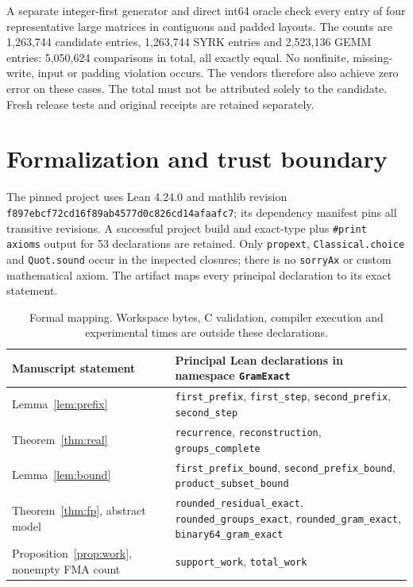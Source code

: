 \documentclass[10pt,a4paper]{article}
\begin{document}
A separate integer-first generator and direct int64 oracle check every entry
of four representative large matrices in contiguous and padded layouts.
The counts are 1,263,744 candidate entries, 1,263,744 SYRK entries and
2,523,136 GEMM entries: 5,050,624 comparisons in total, all exactly equal.
No nonfinite, missing-write, input or padding violation occurs. The vendors
therefore also achieve zero error on these cases. The total must not be
attributed solely to the candidate. Fresh release tests and original receipts
are retained separately.

\section{Formalization and trust boundary}\label{sec:formal}
The pinned project uses Lean 4.24.0 and mathlib revision
\texttt{f897ebcf72cd16f89ab4577d0c826cd14afaafc7}; its dependency manifest
pins all transitive revisions. A successful project build and exact-type plus
\texttt{\#print axioms} output for 53 declarations are retained. Only
\texttt{propext}, \texttt{Classical.choice} and \texttt{Quot.sound} occur in
the inspected closures; there is no \texttt{sorryAx} or custom mathematical
axiom. The artifact maps every principal declaration to its exact statement.

\begin{table}[h]
\centering\small
\begin{tabular}{p{.34\linewidth}p{.59\linewidth}}
\toprule
Manuscript statement & Principal Lean declarations in namespace \texttt{GramExact}\\
\midrule
Lemma~\ref{lem:prefix} & \texttt{first\_prefix}, \texttt{first\_step}, \texttt{second\_prefix}, \texttt{second\_step}\\
Theorem~\ref{thm:real} & \texttt{recurrence}, \texttt{reconstruction}, \texttt{groups\_complete}\\
Lemma~\ref{lem:bound} & \texttt{first\_prefix\_bound}, \texttt{second\_prefix\_bound}, \texttt{product\_subset\_bound}\\
Theorem~\ref{thm:fp}, abstract model & \texttt{rounded\_residual\_exact}, \texttt{rounded\_groups\_exact}, \texttt{rounded\_gram\_exact}, \texttt{binary64\_gram\_exact}\\
Proposition~\ref{prop:work}, nonempty FMA count & \texttt{support\_work}, \texttt{total\_work}\\
\bottomrule
\end{tabular}
\caption{Formal mapping. Workspace bytes, C validation, compiler execution and
experimental times are outside these declarations.}
\label{tab:lean}
\end{table}
\end{document}

